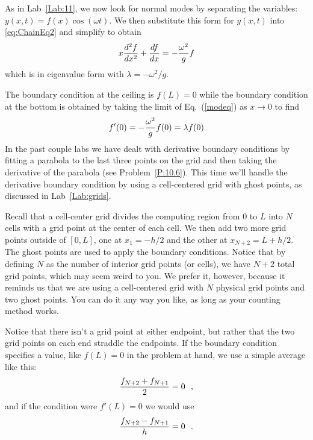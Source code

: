As in Lab~\ref{Lab:11}, we now look for normal modes by separating the
variables: $y(x,t) = f(x) \cos{(\omega t)}$. We then substitute this
form for $y(x,t)$ into \eqref{eq:ChainEq2} and simplify to obtain
\begin{equation}
    x {d^2 f \over dx^2} +
    {df \over dx} = -{\omega^2 \over g} f
    \label{modeq}
\end{equation}
which is in eigenvalue form with $\lambda=-\omega^2/g$. 


The boundary condition at the ceiling is $f(L)=0$ while the
boundary condition at the bottom is obtained by taking the
limit of Eq.~(\ref{modeq}) as $x \rightarrow 0$ to find
\begin{equation}
    f'(0)=-{\omega^2 \over g} f(0) = \lambda f(0)
    \label{bottom}
\end{equation}
In the past couple labs we have dealt with derivative boundary
conditions by fitting a parabola to the last three points on
the grid and then taking the derivative of the parabola (see
Problem~\ref{P:10.6}).  This time we'll handle
the derivative boundary condition by using a cell-centered grid
with ghost points, as discussed in Lab~\ref{Lab:grids}.



Recall that a cell-center grid divides the computing region from $0$
to $L$ into $N$ cells with a grid point at the center of each cell.
We then add two more grid points outside of $[0,L]$, one at
$x_1=-h/2$ and the other at $x_{N+2}=L+h/2$.  The
ghost points are used to apply the boundary conditions. Notice that
by defining $N$ as the number of interior grid points (or cells), we
have $N+2$ total grid points, which may seem weird to you. We prefer
it, however, because it reminds us that we are using a cell-centered
grid with $N$ physical grid points and two ghost points. You can do
it any way you like, as long as your counting method works.

Notice that there isn't a grid point at either endpoint, but
rather that the two grid points on each end straddle the
endpoints. If the boundary condition specifies a value, like
$f(L)=0$ in the problem at hand, we use a simple average like
this:
\begin{equation}
    {f_{N+2}+f_{N+1} \over 2} = 0~~,
    \label{topbdy}
\end{equation}
and if the condition were $f'(L)=0$ we would use
\begin{equation}
    {f_{N+2}-f_{N+1} \over h} = 0~~.
\end{equation}

